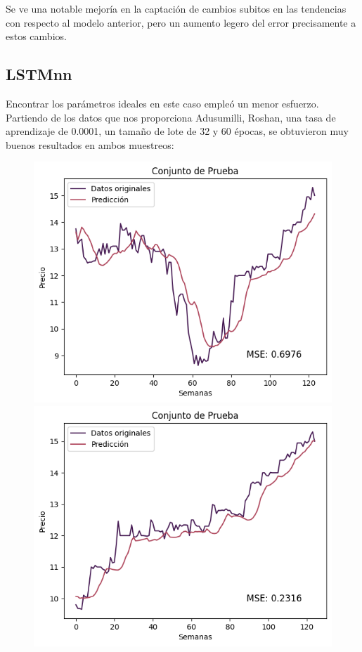 Se ve una notable mejoría en la captación de cambios subitos en las tendencias con respecto al modelo anterior, pero un aumento legero del error precisamente a estos cambios.

\newpage
\subsection{LSTMnn}

Encontrar los parámetros ideales en este caso empleó un menor esfuerzo. Partiendo de los datos que nos proporciona Adusumilli, Roshan, una tasa de aprendizaje de 0.0001, un tamaño de lote de 32 y 60 épocas, se obtuvieron muy buenos resultados en ambos muestreos:

\begin{figure}[H]
    \begin{minipage}{0.5\textwidth}
        \centering
        \includegraphics[width=\linewidth]{Figuras/proceso_de_entrenamiento/grafs_c_prueba/muestreo_aleatorio/LSTM/estandar/LSTM.png}
    \end{minipage}
    \begin{minipage}{0.5\textwidth}
        \centering
        \includegraphics[width=\linewidth]{Figuras/proceso_de_entrenamiento/grafs_c_prueba/LSTM/estandar/LSTM.png}

\end{minipage}
\end{figure}
